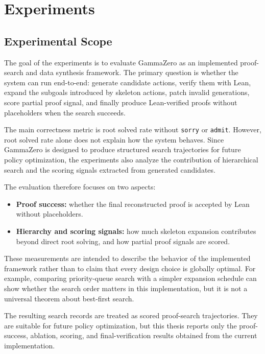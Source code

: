 \chapter{Experiments}
\label{sec:experiments}

\section{Experimental Scope}

The goal of the experiments is to evaluate GammaZero as an implemented proof-search and data synthesis framework. The primary question is whether the system can run end-to-end: generate candidate actions, verify them with Lean, expand the subgoals introduced by skeleton actions, patch invalid generations, score partial proof signal, and finally produce Lean-verified proofs without placeholders when the search succeeds.

The main correctness metric is root solved rate without \texttt{sorry} or \texttt{admit}. However, root solved rate alone does not explain how the system behaves. Since GammaZero is designed to produce structured search trajectories for future policy optimization, the experiments also analyze the contribution of hierarchical search and the scoring signals extracted from generated candidates.

The evaluation therefore focuses on two aspects:
\begin{itemize}
    \item \textbf{Proof success:} whether the final reconstructed proof is accepted by Lean without placeholders.
    \item \textbf{Hierarchy and scoring signals:} how much skeleton expansion contributes beyond direct root solving, and how partial proof signals are scored.
\end{itemize}

These measurements are intended to describe the behavior of the implemented framework rather than to claim that every design choice is globally optimal. For example, comparing priority-queue search with a simpler expansion schedule can show whether the search order matters in this implementation, but it is not a universal theorem about best-first search.

The resulting search records are treated as scored proof-search trajectories. They are suitable for future policy optimization, but this thesis reports only the proof-success, ablation, scoring, and final-verification results obtained from the current implementation.

